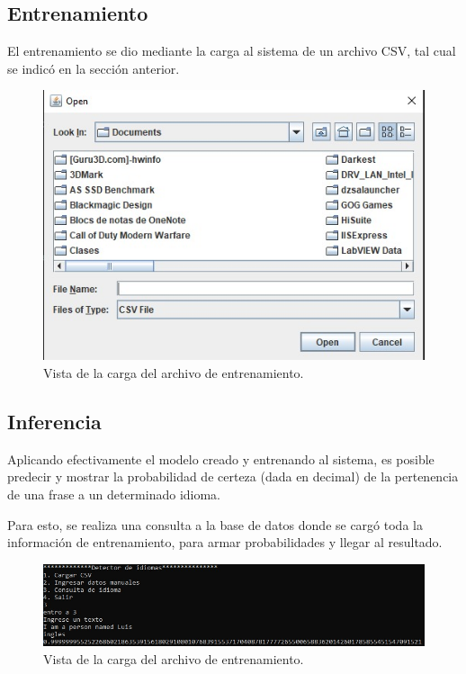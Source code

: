 \documentclass[sigconf]{acmart}
\begin{document}
\subsection{Entrenamiento}
El entrenamiento se dio mediante la carga al sistema de un archivo CSV, tal cual se indicó en la sección anterior.

\begin{figure}[h]
  \centering
  \includegraphics[width=\linewidth]{csv}
  \caption{Vista de la carga del archivo de entrenamiento.}
\end{figure}

\subsection{Inferencia}
Aplicando efectivamente el modelo creado y entrenando al sistema, es posible predecir y mostrar la probabilidad de certeza (dada en decimal) de la pertenencia de una frase a un determinado idioma.

Para esto, se realiza una consulta a la base de datos donde se cargó toda la información de entrenamiento, para armar probabilidades y llegar al resultado.

\begin{figure}[h]
  \centering
  \includegraphics[width=\linewidth]{inferencia}
  \caption{Vista de la carga del archivo de entrenamiento.}
\end{figure}
\end{document}

